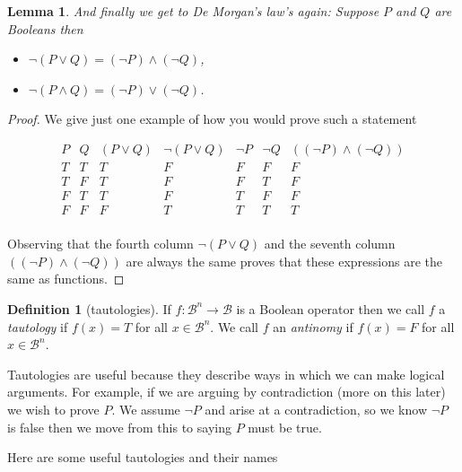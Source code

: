 \documentclass[
]{book}
\newtheorem{lemma}{Lemma}[chapter]
\theoremstyle{definition}
\newtheorem{definition}{Definition}[chapter]
\theoremstyle{definition}
\theoremstyle{definition}
\theoremstyle{definition}
\theoremstyle{remark}
\begin{document}
\begin{lemma}

And finally we get to De Morgan's law's again:
Suppose \(P\) and \(Q\) are Booleans then

\begin{itemize}
\item
  \(\neg (P \vee Q) = (\neg P) \wedge (\neg Q)\),
\item
  \(\neg (P \wedge Q) = (\neg P) \vee (\neg Q)\).
\end{itemize}

\end{lemma}

\begin{proof}
We give just one example of how you would prove such a statement

\begin{equation*}
\begin{array}{cc|ccccc}
P & Q & (P \vee Q) & \neg (P \vee Q) & \neg P & \neg Q & ((\neg P) \wedge (\neg Q)) \\
\hline
T & T & T & F & F & F & F\\
T & F & T & F & F & T & F\\
F & T & T & F & T & F & F\\
F & F & F & T & T & T & T \\
\end{array}
\end{equation*}

Observing that the fourth column \(\neg (P \vee Q)\) and the seventh column \(((\neg P) \wedge (\neg Q))\) are always the same proves that these expressions are the same as functions.
\end{proof}

\begin{definition}[tautologies]
If \(f: \mathcal{B}^n \rightarrow \mathcal{B}\) is a Boolean operator then we call \(f\) a \emph{tautology} if \(f(x) = T\) for all \(x \in \mathcal{B}^n\). We call \(f\) an \emph{antinomy} if \(f(x) = F\) for all \(x \in \mathcal{B}^n\).
\end{definition}

Tautologies are useful because they describe ways in which we can make logical arguments. For example, if we are arguing by contradiction (more on this later) we wish to prove \(P\). We assume \(\neg P\) and arise at a contradiction, so we know \(\neg P\) is false then we move from this to saying \(P\) must be true.

Here are some useful tautologies and their names
\end{document}
